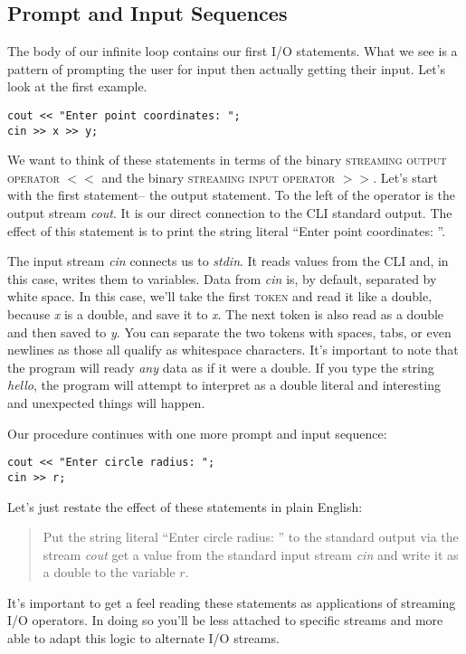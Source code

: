 \documentclass[]{tufte-handout}
\begin{document}
\subsection{Prompt and Input Sequences}

The body of our infinite loop contains our first I/O statements. What we see is a pattern of prompting the user for input then actually getting their input. Let's look at the first example. 
\begin{verbatim}
cout << "Enter point coordinates: ";
cin >> x >> y;
\end{verbatim}

We want to think of these statements in terms of the binary \textsc{streaming output operator} $<<$ and the binary \textsc{streaming input operator} $>>$. Let's start with the first statement-- the output statement. To the left of the operator is the output stream \textit{cout}. It is our direct connection to the CLI standard output. The effect of this statement is to print the string literal ``Enter point coordinates: ''. 

The input stream \textit{cin} connects us to \textit{stdin}. It reads values from the CLI and, in this case, writes them to variables. Data from \textit{cin} is, by default, separated by white space. In this case, we'll take the first \textsc{token} and read it like a double, because \textit{x} is a double, and save it to \textit{x}. The next token is also read as a double and then saved to \textit{y}. You can separate the two tokens with spaces, tabs, or even newlines as those all qualify as whitespace characters. It's important to note that the program will ready \textit{any} data as if it were a double.  If you type the string \textit{hello}, the program will attempt to interpret as a double literal and interesting and unexpected things will happen. 


Our procedure continues with one more prompt and input sequence:
\begin{verbatim}
cout << "Enter circle radius: ";
cin >> r;
\end{verbatim}
Let's just restate the effect of these statements in plain English:
\begin{quote}
Put the string literal ``Enter circle radius: '' to the standard output via the stream \textit{cout} get a value from the standard input stream \textit{cin} and write it as a double to the variable $r$.
\end{quote}
It's important to get a feel reading these statements as applications of streaming I/O operators. In doing so you'll be less attached to specific streams and more able to adapt this logic to alternate I/O streams.
\end{document}
